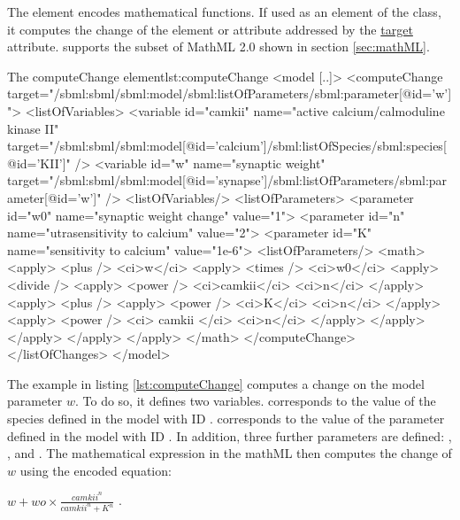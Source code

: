 The  element encodes mathematical functions. 
If used as an element of the  class, it computes the change of the element or attribute addressed by the \hyperref[sec:target]{target} attribute.
\LoneVone supports the subset of MathML 2.0 shown in section \ref{sec:mathML}.

%
\begin{myXmlLst}{The computeChange element}{lst:computeChange}
<model [..]>
    <computeChange target="/sbml:sbml/sbml:model/sbml:listOfParameters/sbml:parameter[@id='w']">
      <listOfVariables>
        <variable id="camkii" name="active calcium/calmoduline kinase II" 
                  target="/sbml:sbml/sbml:model[@id='calcium']/sbml:listOfSpecies/sbml:species[@id='KII']" />
        <variable id="w" name="synaptic weight"
                  target="/sbml:sbml/sbml:model[@id='synapse']/sbml:listOfParameters/sbml:parameter[@id='w']" />
      <listOfVariables/>
      <listOfParameters>
        <parameter id="w0" name="synaptic weight change" value="1">
        <parameter id="n" name="utrasensitivity to calcium" value="2">
        <parameter id="K" name="sensitivity to calcium" value="1e-6">
      <listOfParameters/>
      <math>
         <apply>
           <plus />
           <ci>w</ci>
           <apply>
             <times />
             <ci>w0</ci>
             <apply>
               <divide />
               <apply>
                 <power />
                 <ci>camkii</ci>
                 <ci>n</ci>
               </apply>
               <apply>
                 <plus />
                 <apply>
                   <power />
                   <ci>K</ci>
                   <ci>n</ci>
                 </apply>
                 <apply>
                   <power />
                   <ci> camkii </ci>
                   <ci>n</ci>
                 </apply>
               </apply>
             </apply>
           </apply> 
         </apply>
      </math>
    </computeChange>
  </listOfChanges>
</model>
\end{myXmlLst}
%

The example in listing \ref{lst:computeChange} computes a change on the model parameter $w$. To do so, it defines two variables.  corresponds to the value of the species  defined in the model with ID .  corresponds to the value of the parameter  defined in the model with ID . 
In addition, three further parameters are defined: , , and .
The mathematical expression in the mathML then computes the change of $w$ using the encoded equation:

\begin{math}
w + wo \times \frac{camkii^{n}}{camkii^{n}+K^{n}}
\end{math}
.


